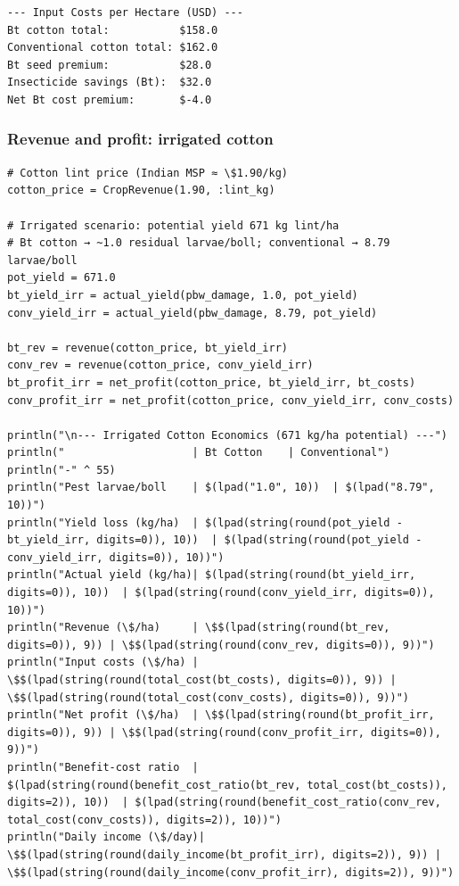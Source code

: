 \begin{verbatim}
--- Input Costs per Hectare (USD) ---
Bt cotton total:           $158.0
Conventional cotton total: $162.0
Bt seed premium:           $28.0
Insecticide savings (Bt):  $32.0
Net Bt cost premium:       $-4.0
\end{verbatim}



\subsubsection{Revenue and profit: irrigated cotton}



\label{16004500273210670356}{}



\begin{verbatim}
# Cotton lint price (Indian MSP ≈ \$1.90/kg)
cotton_price = CropRevenue(1.90, :lint_kg)

# Irrigated scenario: potential yield 671 kg lint/ha
# Bt cotton → ~1.0 residual larvae/boll; conventional → 8.79 larvae/boll
pot_yield = 671.0
bt_yield_irr = actual_yield(pbw_damage, 1.0, pot_yield)
conv_yield_irr = actual_yield(pbw_damage, 8.79, pot_yield)

bt_rev = revenue(cotton_price, bt_yield_irr)
conv_rev = revenue(cotton_price, conv_yield_irr)
bt_profit_irr = net_profit(cotton_price, bt_yield_irr, bt_costs)
conv_profit_irr = net_profit(cotton_price, conv_yield_irr, conv_costs)

println("\n--- Irrigated Cotton Economics (671 kg/ha potential) ---")
println("                    | Bt Cotton    | Conventional")
println("-" ^ 55)
println("Pest larvae/boll    | $(lpad("1.0", 10))  | $(lpad("8.79", 10))")
println("Yield loss (kg/ha)  | $(lpad(string(round(pot_yield - bt_yield_irr, digits=0)), 10))  | $(lpad(string(round(pot_yield - conv_yield_irr, digits=0)), 10))")
println("Actual yield (kg/ha)| $(lpad(string(round(bt_yield_irr, digits=0)), 10))  | $(lpad(string(round(conv_yield_irr, digits=0)), 10))")
println("Revenue (\$/ha)     | \$$(lpad(string(round(bt_rev, digits=0)), 9)) | \$$(lpad(string(round(conv_rev, digits=0)), 9))")
println("Input costs (\$/ha) | \$$(lpad(string(round(total_cost(bt_costs), digits=0)), 9)) | \$$(lpad(string(round(total_cost(conv_costs), digits=0)), 9))")
println("Net profit (\$/ha)  | \$$(lpad(string(round(bt_profit_irr, digits=0)), 9)) | \$$(lpad(string(round(conv_profit_irr, digits=0)), 9))")
println("Benefit-cost ratio  | $(lpad(string(round(benefit_cost_ratio(bt_rev, total_cost(bt_costs)), digits=2)), 10))  | $(lpad(string(round(benefit_cost_ratio(conv_rev, total_cost(conv_costs)), digits=2)), 10))")
println("Daily income (\$/day)| \$$(lpad(string(round(daily_income(bt_profit_irr), digits=2)), 9)) | \$$(lpad(string(round(daily_income(conv_profit_irr), digits=2)), 9))")
\end{verbatim}




